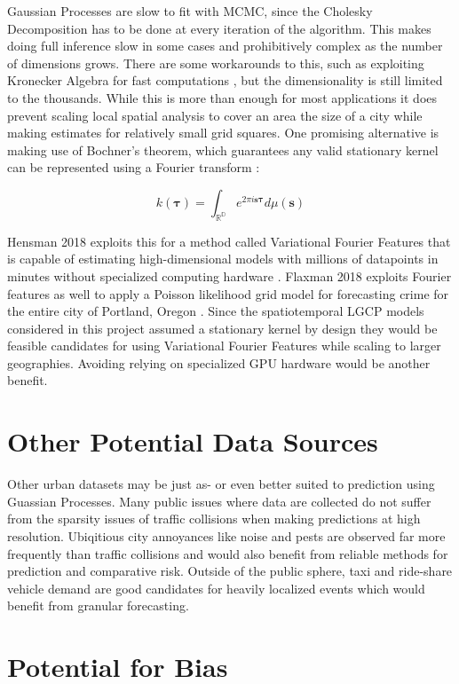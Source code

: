 Gaussian Processes are slow to fit with MCMC, since the Cholesky Decomposition has to be done at every iteration of the algorithm. This makes doing full inference slow in some cases and prohibitively complex as the number of dimensions grows. There are some workarounds to this, such as exploiting Kronecker Algebra for fast computations \cite{flaxman_2015_FastKron}, but the dimensionality is still limited to the thousands. While this is more than enough for most applications it does prevent scaling local spatial analysis to cover an area the size of a city while making estimates for relatively small grid squares. One promising alternative is making use of Bochner's theorem, which guarantees any valid stationary kernel can be represented using a Fourier transform \cite{rasmussen_2005}:

$$ k(\mathbf{\tau})=\int_{\mathbb{R^D}}e^{2\pi i \mathbf{s}\mathbf{\tau}}d\mu(\mathbf{s}) $$

Hensman 2018 exploits this for a method called Variational Fourier Features that is capable of estimating high-dimensional models with millions of datapoints in minutes without specialized computing hardware \cite{hensman_vff}. Flaxman 2018 exploits Fourier features as well to apply a Poisson likelihood grid model for forecasting crime for the entire city of Portland, Oregon \cite{flaxman_2018}. Since the spatiotemporal LGCP models considered in this project assumed a stationary kernel by design they would be feasible candidates for using Variational Fourier Features while scaling to larger geographies. Avoiding relying on specialized GPU hardware would be another benefit.


\section{Other Potential Data Sources}

Other urban datasets may be just as- or even better suited to prediction using Guassian Processes. Many public issues where data are collected do not suffer from the sparsity issues of traffic collisions when making predictions at high resolution. Ubiqitious city annoyances like noise and pests are observed far more frequently than traffic collisions and would also benefit from reliable methods for prediction and comparative risk. Outside of the public sphere, taxi and ride-share vehicle demand are good candidates for heavily localized events which would benefit from granular forecasting.


\section{Potential for Bias}


